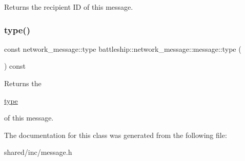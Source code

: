\begin{DoxyReturn}{Returns}
the recipient ID of this message. 
\end{DoxyReturn}
\mbox{\label{classbattleship_1_1network__message_1_1message_a19cd4318b0e70831ddbf340597d040a4}} 
\subsubsection{\texorpdfstring{type()}{type()}}
{\footnotesize\ttfamily const network\+\_\+message\+::type battleship\+::network\+\_\+message\+::message\+::type (\begin{DoxyParamCaption}{ }\end{DoxyParamCaption}) const\hspace{0.3cm}{\ttfamily [inline]}}

\begin{DoxyReturn}{Returns}
the
\begin{DoxyCode}
\hyperlink{classbattleship_1_1network__message_1_1message_a19cd4318b0e70831ddbf340597d040a4}{type} 
\end{DoxyCode}
 of this message. 
\end{DoxyReturn}


The documentation for this class was generated from the following file\+:\begin{DoxyCompactItemize}
\item 
shared/inc/message.\+h\end{DoxyCompactItemize}
